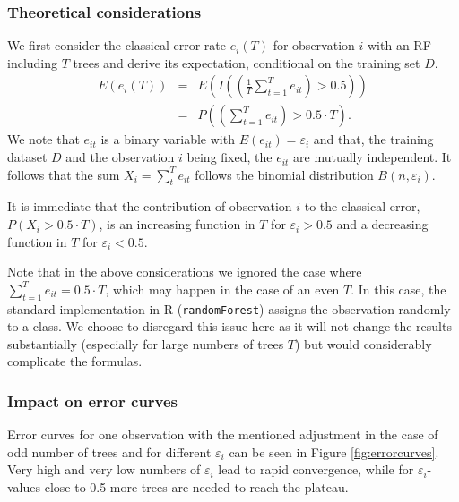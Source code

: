 \documentclass[paper=a4
               ,12pt
               ,DIV=12
               ,parskip=half
               ,titlepage=on
               ,headinclude 
               ,footinclude
               ,headsepline
               ,footsepline         %
               ,ilines 
               ]{scrartcl}
\begin{document}
\subsubsection{Theoretical considerations}
We first consider the classical error rate $e_i(T)$ for observation $i$ with an RF including $T$ trees and derive its expectation, conditional on the training set $D$. 
\begin{eqnarray*}
 E(e_i(T)) & = &  E(I ((\frac{1}{T} \sum_{t=1}^T e_{it} ) > 0.5))\\
 & = & P((\sum_{t=1}^T e_{it} ) > 0.5 \cdot T). 
\end{eqnarray*}
We note that $e_{it}$ is a binary variable with $E(e_{it})=\varepsilon_i$ and that, the training dataset $D$ and the observation $i$ being fixed, the $e_{it}$ are mutually independent. It follows that  the sum $X_i=\sum_{t}^Te_{it}$ follows the binomial distribution $B(n, \varepsilon_i)$. 

It is immediate that the contribution of observation $i$ to the classical error, $P(X_i>0.5 \cdot T)$, is an increasing function in $T$ for $\varepsilon_i > 0.5$ and a decreasing function in $T$ for $\varepsilon_i < 0.5$. 

Note that in the above considerations we ignored the case where $\sum_{t=1}^T e_{it}  = 0.5 \cdot T$, which may happen in the case of an even $T$. In this case, the standard implementation in R (\texttt{randomForest}) assigns the observation randomly to a class. We choose to disregard this issue here as it will not change the results substantially (especially for large numbers of trees $T$) but would considerably complicate the formulas.  

\subsubsection{Impact on error curves}
Error curves for one observation with the mentioned adjustment in the case of odd number of trees and for different $\varepsilon_i$ can be seen in Figure \ref{fig:errorcurves}. Very high and very low numbers of $\varepsilon_i$ lead to rapid convergence, while for $\varepsilon_i$-values close to 0.5 more trees 
are needed to reach the plateau. 
\end{document}
